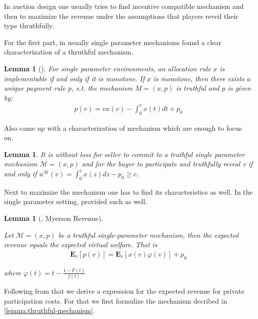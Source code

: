 \documentclass[11pt,a4paper]{article}
\newtheorem{lemma}[theorem]{Lemma}
\newcommand{\1}[1]{\mbox{\rm\bf 1}_{#1}}
\begin{document}
\begin{section}{}
 In auction design one usually tries to find incentive compatible mechanism and then to maximize the revenue under the assumptions that players reveil their type thruthfully.

 For the first part, in usually single parameter mechanisms \cite{myerson} found a clear characterization of a thruthful mechanism.

 \begin{lemma}[\cite{myerson}]
     For single parameter environments, an allocation rule $x$ is implementable if and only if it is monotone.
     If $x$ is monotone, then there exists a unique payment rule $p$, s.t. the mechanism $M=(x,p)$ is truthful
     and $p$ is given by:
     \begin{align*}
         p(v) = v x(v) - \int_0^v x(t) dt + p_0
     \end{align*}
 \end{lemma}

 Also \cite{primary} came up with a characterization of mechanism which are enough to focus on.

 \begin{lemma}{\cite{primary}}
     \label{lemma:thruthful-mechanism}
     It is without loss for seller to commit to a truthful single parameter mechanism $\mathcal{M}=(x,p)$ and
     for the buyer to participate and truthfully reveal v if and only if $u^\mathcal{M}(v) = \int_0^v x(z)dz - p_0 \geq c$.
 \end{lemma}

 Next to maximize the mechanism one has to find its characteristics as well.
 In the single parameter setting, \cite{myerson} provided such as well.

 \begin{lemma}[\cite{myerson}, Myerson Revenue]
     \label{lemma:myerson-revenue}

     Let $\mathcal{M}=(x,p)$ be a truthful single-parameter mechanism, then the expected revenue equals the expected virtual welfare. That is
     \begin{align*}
         \mathbf{E}_v\left[p(v)\right]
         = \mathbf{E}_v\left[x(v)\varphi(v)\right] + p_0
     \end{align*}

     where $\varphi(t) = t - \frac{1 - F(t)}{f(t)}$
 \end{lemma}

 Following from that we derive a expression for the expected revenue for private participation costs.
 For that we first formulize the mechanism decribed in \autoref{lemma:thruthful-mechanism}.


\end{section}
\end{document}
